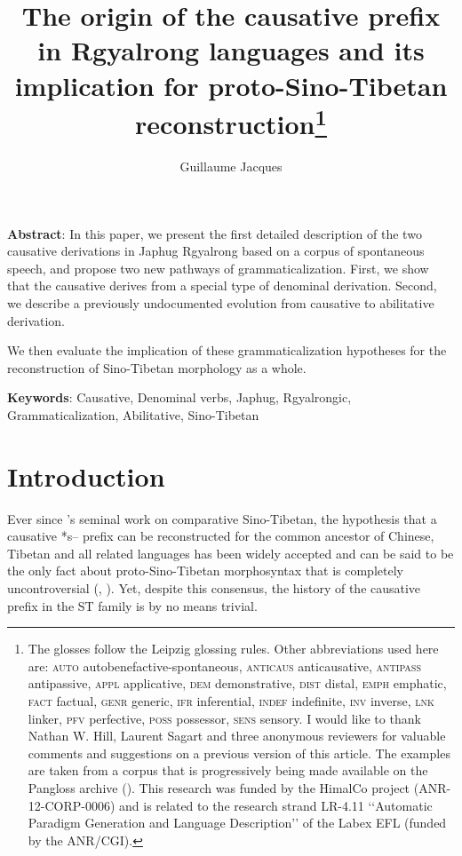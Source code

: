 \documentclass[oldfontcommands,oneside,a4paper,11pt]{article}
\begin{document}
 
\linenumbers
\title{The origin of the causative prefix in Rgyalrong languages and its implication for proto-Sino-Tibetan reconstruction\footnote{
The glosses follow the Leipzig glossing rules. Other abbreviations used here are: \textsc{auto}  autobenefactive-spontaneous, \textsc{anticaus} anticausative, \textsc{antipass} antipassive, \textsc{appl} applicative, \textsc{dem} demonstrative,  \textsc{dist} distal, \textsc{emph} emphatic, \textsc{fact} factual, \textsc{genr} generic, \textsc{ifr} inferential, \textsc{indef} indefinite, \textsc{inv} inverse,  \textsc{lnk} linker, \textsc{pfv} perfective, \textsc{poss} possessor,  \textsc{sens} sensory. I would like to thank Nathan W. Hill, Laurent Sagart and three anonymous reviewers for valuable comments and suggestions on a previous version of this article. The examples are taken from a corpus that is progressively being made available on the Pangloss archive (\citealt{michailovsky14pangloss}). This research was funded by the HimalCo project (ANR-12-CORP-0006) and is related to the research strand LR-4.11 ‘‘Automatic Paradigm Generation and Language Description’’ of the Labex EFL (funded by the ANR/CGI). } }
\author{Guillaume Jacques}
\maketitle
\sloppy

\textbf{Abstract}: In this paper, we present the first detailed description of the two causative derivations in Japhug Rgyalrong based on a corpus of spontaneous speech, and propose two new pathways of grammaticalization. First, we show that the causative derives from a special type of denominal derivation. Second, we describe a previously undocumented evolution from causative to abilitative derivation. 

We then evaluate the implication of these grammaticalization hypotheses for the reconstruction of Sino-Tibetan morphology as a whole.

\textbf{Keywords}: Causative, Denominal verbs, Japhug, Rgyalrongic, Grammaticalization, Abilitative, Sino-Tibetan

\section{Introduction}

Ever since \citet{conrady1896}'s seminal work on comparative Sino-Tibetan, the hypothesis that a causative *s-- prefix can be reconstructed for the  common ancestor of Chinese, Tibetan and all related languages has been widely accepted and can be said to be the only fact about proto-Sino-Tibetan morphosyntax that is completely uncontroversial (\citealt{wolfenden29outlines, benedict72, matisoff03}, \citealt{lapolla03}).  Yet, despite this consensus, the history of the causative prefix in the ST family is by no means trivial. 
\end{document}
